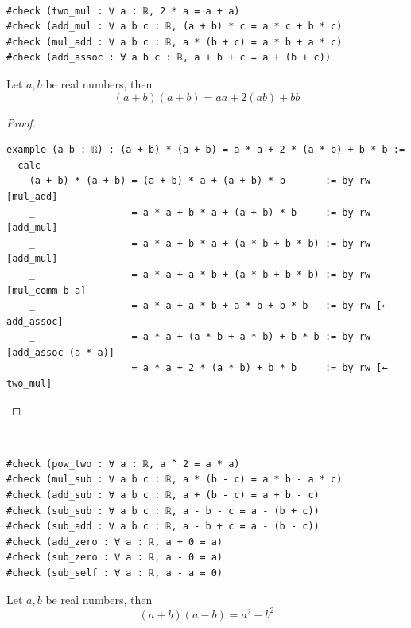 \documentclass{blog}
\begin{document}
\begin{definition}~
  \begin{verbatim}
#check (two_mul : ∀ a : ℝ, 2 * a = a + a)
#check (add_mul : ∀ a b c : ℝ, (a + b) * c = a * c + b * c)
#check (mul_add : ∀ a b c : ℝ, a * (b + c) = a * b + a * c)
#check (add_assoc : ∀ a b c : ℝ, a + b + c = a + (b + c))
\end{verbatim}
\end{definition}

\begin{proposition}
  Let $a, b$ be real numbers, then
  \begin{equation*}
    (a + b) (a + b) = a a + 2 (a b) + b b
  \end{equation*}
\end{proposition}

\begin{proof}~
  \begin{verbatim}
example (a b : ℝ) : (a + b) * (a + b) = a * a + 2 * (a * b) + b * b :=
  calc
    (a + b) * (a + b) = (a + b) * a + (a + b) * b       := by rw [mul_add]
    _                 = a * a + b * a + (a + b) * b     := by rw [add_mul]
    _                 = a * a + b * a + (a * b + b * b) := by rw [add_mul]
    _                 = a * a + a * b + (a * b + b * b) := by rw [mul_comm b a]
    _                 = a * a + a * b + a * b + b * b   := by rw [← add_assoc]
    _                 = a * a + (a * b + a * b) + b * b := by rw [add_assoc (a * a)]
    _                 = a * a + 2 * (a * b) + b * b     := by rw [← two_mul]
\end{verbatim}
\end{proof}

\begin{definition}~
  \begin{verbatim}
#check (pow_two : ∀ a : ℝ, a ^ 2 = a * a)
#check (mul_sub : ∀ a b c : ℝ, a * (b - c) = a * b - a * c)
#check (add_sub : ∀ a b c : ℝ, a + (b - c) = a + b - c)
#check (sub_sub : ∀ a b c : ℝ, a - b - c = a - (b + c))
#check (sub_add : ∀ a b c : ℝ, a - b + c = a - (b - c))
#check (add_zero : ∀ a : ℝ, a + 0 = a)
#check (sub_zero : ∀ a : ℝ, a - 0 = a)
#check (sub_self : ∀ a : ℝ, a - a = 0)
\end{verbatim}
\end{definition}

\begin{proposition}
  Let $a, b$ be real numbers, then
  \begin{equation*}
    (a + b) (a - b) = a^{2} - b^{2}
  \end{equation*}
\end{proposition}
\end{document}
